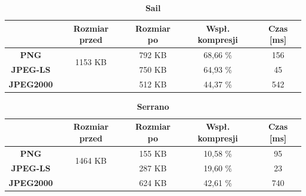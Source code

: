 \begin{table}[!h]
	\centering
	\caption{\textbf{Sail}}
	\label{my-label}
	\begin{tabular}{|c|c|c|c|c|}                                             
		\hline
		& \textbf{Rozmiar przed} & \textbf{Rozmiar po} & \textbf{Wspł. kompresji} & \textbf{Czas {[}ms{]}} \\ \hline 
		\textbf{PNG}      &          \multicolumn{1}{c|}{\multirow{2}{*}{1153 KB}}             &       792 KB              &         68,66 \%                 &           156                  \\\cline{3-5}
		\textbf{JPEG-LS}  &                        &        750  KB           &         64,93 \%                &          45                \\\cline{3-5}
		\textbf{JPEG2000} &                        &        512 KB             &      44,37 \%                   &      542                \\ \hline
	\end{tabular}
\end{table}

\begin{table}[!h]
	\centering
	\caption{\textbf{Serrano}}
	\label{my-label}
	\begin{tabular}{|c|c|c|c|c|}                                             
		\hline
		& \textbf{Rozmiar przed} & \textbf{Rozmiar po} & \textbf{Wspł. kompresji} & \textbf{Czas {[}ms{]}} \\ \hline 
		\textbf{PNG}      &          \multicolumn{1}{c|}{\multirow{2}{*}{1464 KB}}             &       155 KB              &            10,58 \%              &           95                  \\\cline{3-5}
		\textbf{JPEG-LS}  &                        &         287 KB            &      19,60 \%                   &          23                \\\cline{3-5}
		\textbf{JPEG2000} &                        &         624 KB            &         42,61 \%                 &       740               \\ \hline
	\end{tabular}
\end{table}

